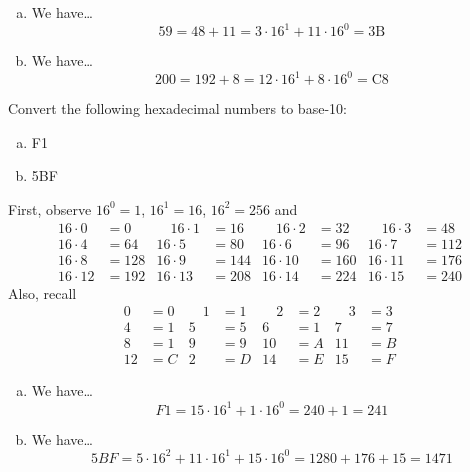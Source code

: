 \documentclass[11pt,letterpaper]{article}
\begin{document}
\begin{enumerate}[(a)]
\item We have\dots
	\[
	59= 48 + 11= 3 \cdot 16^1 + 11 \cdot 16^0= 3\text{B}
	\]

\item  We have\dots
	\[
	200= 192 + 8= 12 \cdot 16^1 + 8 \cdot 16^0= \text{C}8
	\]
\end{enumerate}





\newpage





 Convert the following hexadecimal numbers to base-10:
        \begin{enumerate}[(a)]
        \item F1
        \item 5BF
        \end{enumerate} \pspace

\sol First, observe $16^0= 1$, $16^1= 16$, $16^2= 256$ and
	\[
	\begin{aligned}
	16 \cdot 0&= 0 &\quad 16 \cdot 1&= 16 &\quad 16 \cdot 2&= 32 &\quad 16 \cdot 3&= 48 \\
	16 \cdot 4&= 64 & 16 \cdot 5&= 80 & 16 \cdot 6&= 96 & 16 \cdot 7&= 112 \\
	16 \cdot 8&= 128 & 16 \cdot 9&= 144 & 16 \cdot 10&= 160 & 16 \cdot 11&= 176 \\
	16 \cdot 12&= 192 & 16 \cdot 13&= 208 & 16 \cdot 14&= 224 & 16 \cdot 15&= 240
	\end{aligned}
	\]
Also, recall
	\[
	\begin{aligned}
	0&= 0 &\quad 1&= 1 &\quad 2&= 2 &\quad 3&= 3 \\
	4&= 1 & 5&= 5 & 6&= 1 & 7&= 7 \\
	8&= 1 & 9&= 9 & 10&= A & 11&= B \\
	12&= C & 2&= D & 14&= E & 15&= F 
	\end{aligned}
	\]
\begin{enumerate}[(a)] 
\item We have\dots
	\[
	F1= 15 \cdot 16^1 + 1 \cdot 16^0= 240 + 1= 241
	\]

\item We have\dots
	\[
	5BF= 5 \cdot 16^2 + 11 \cdot 16^1 + 15 \cdot 16^0= 1280 + 176 + 15= 1471
	\]
\end{enumerate}
\end{document}
